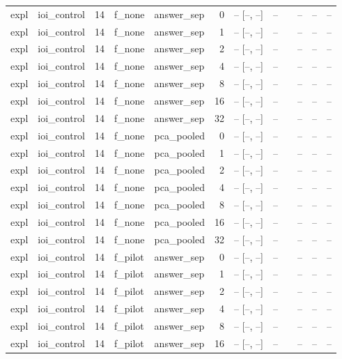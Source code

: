 \begin{tabular}{llrllrrrlrrr}
expl & ioi\_control & 14 & f\_none & answer\_sep & 0 & -- [--, --] & -- &  & -- & -- & -- \\
expl & ioi\_control & 14 & f\_none & answer\_sep & 1 & -- [--, --] & -- &  & -- & -- & -- \\
expl & ioi\_control & 14 & f\_none & answer\_sep & 2 & -- [--, --] & -- &  & -- & -- & -- \\
expl & ioi\_control & 14 & f\_none & answer\_sep & 4 & -- [--, --] & -- &  & -- & -- & -- \\
expl & ioi\_control & 14 & f\_none & answer\_sep & 8 & -- [--, --] & -- &  & -- & -- & -- \\
expl & ioi\_control & 14 & f\_none & answer\_sep & 16 & -- [--, --] & -- &  & -- & -- & -- \\
expl & ioi\_control & 14 & f\_none & answer\_sep & 32 & -- [--, --] & -- &  & -- & -- & -- \\
expl & ioi\_control & 14 & f\_none & pca\_pooled & 0 & -- [--, --] & -- &  & -- & -- & -- \\
expl & ioi\_control & 14 & f\_none & pca\_pooled & 1 & -- [--, --] & -- &  & -- & -- & -- \\
expl & ioi\_control & 14 & f\_none & pca\_pooled & 2 & -- [--, --] & -- &  & -- & -- & -- \\
expl & ioi\_control & 14 & f\_none & pca\_pooled & 4 & -- [--, --] & -- &  & -- & -- & -- \\
expl & ioi\_control & 14 & f\_none & pca\_pooled & 8 & -- [--, --] & -- &  & -- & -- & -- \\
expl & ioi\_control & 14 & f\_none & pca\_pooled & 16 & -- [--, --] & -- &  & -- & -- & -- \\
expl & ioi\_control & 14 & f\_none & pca\_pooled & 32 & -- [--, --] & -- &  & -- & -- & -- \\
expl & ioi\_control & 14 & f\_pilot & answer\_sep & 0 & -- [--, --] & -- &  & -- & -- & -- \\
expl & ioi\_control & 14 & f\_pilot & answer\_sep & 1 & -- [--, --] & -- &  & -- & -- & -- \\
expl & ioi\_control & 14 & f\_pilot & answer\_sep & 2 & -- [--, --] & -- &  & -- & -- & -- \\
expl & ioi\_control & 14 & f\_pilot & answer\_sep & 4 & -- [--, --] & -- &  & -- & -- & -- \\
expl & ioi\_control & 14 & f\_pilot & answer\_sep & 8 & -- [--, --] & -- &  & -- & -- & -- \\
expl & ioi\_control & 14 & f\_pilot & answer\_sep & 16 & -- [--, --] & -- &  & -- & -- & -- \\

\end{tabular}
